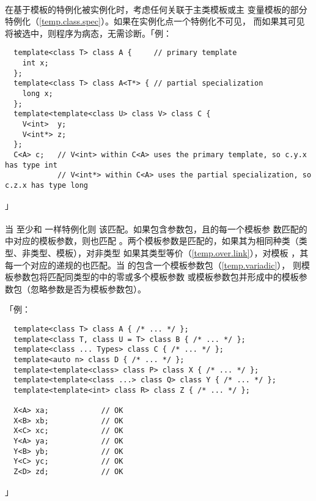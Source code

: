 \paragraph{}
在基于模板的特例化被实例化时，考虑任何关联于主类模板或主
变量模板的部分特例化（\ref{temp.class.spec}）。如果在实例化点一个特例化不可见，
而如果其可见将被选中，则程序为病态，无需诊断。「例：
\begin{lstlisting}
  template<class T> class A {     // primary template
    int x;
  };
  template<class T> class A<T*> { // partial specialization
    long x;
  };
  template<template<class U> class V> class C {
    V<int>  y;
    V<int*> z;
  };
  C<A> c;   // V<int> within C<A> uses the primary template, so c.y.x has type int
            // V<int*> within C<A> uses the partial specialization, so c.z.x has type long
\end{lstlisting}」

\paragraph{}
当 至少和 一样特例化则
该匹配。如果包含参数包，且的每一个模板参
数匹配的中对应的模板参数，则也匹配
。两个模板参数是匹配的，如果其为相同种类（类型、非类型、模板），对非类型
如果其类型等价（\ref{temp.over.link}），对模板
，其每一个对应的递规的也匹配。当
的包含一个模板参数包（\ref{temp.variadic}），
则模板参数包将匹配同类型的中的零或多个模板参数
或模板参数包并形成中的模板参数包（忽略参数是否为模板参数包）。

「例：
\begin{lstlisting}
  template<class T> class A { /* ... */ };
  template<class T, class U = T> class B { /* ... */ };
  template<class ... Types> class C { /* ... */ };
  template<auto n> class D { /* ... */ };
  template<template<class> class P> class X { /* ... */ };
  template<template<class ...> class Q> class Y { /* ... */ };
  template<template<int> class R> class Z { /* ... */ };

  X<A> xa;            // OK
  X<B> xb;            // OK
  X<C> xc;            // OK
  Y<A> ya;            // OK
  Y<B> yb;            // OK
  Y<C> yc;            // OK
  Z<D> zd;            // OK
\end{lstlisting}」

